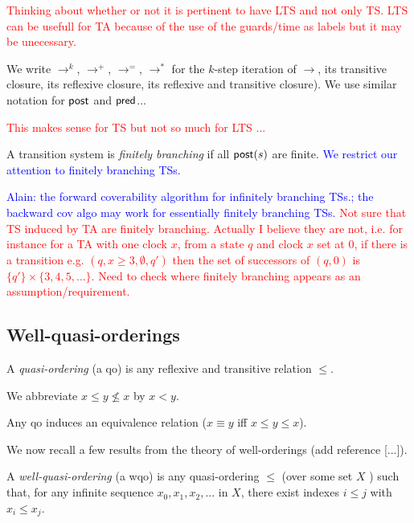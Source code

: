 \textcolor{red}{Thinking about whether or not it is pertinent to have LTS and not only TS. LTS can be usefull for TA because of the use of the guards/time as labels but it may be unecessary.}

We write $\rightarrow^{k}$, $\rightarrow^{+}$, $\rightarrow^{=}$, $\rightarrow^{*}$
for the $k$-step iteration of $\rightarrow$, its transitive closure, its reflexive closure, its reflexive and transitive closure). We use similar notation for $\textsf{post}$ and $\textsf{pred}$...

\textcolor{red}{This makes sense for TS but not so much for LTS ...}

A transition system is {\em finitely branching} if all $\textsf{post}(s)$ are finite. 
\textcolor{blue}{We restrict our attention to finitely branching TSs.}

\textcolor{blue}{Alain: the forward coverability algorithm for infinitely branching TSs.; the backward cov algo may work for essentially finitely branching TSs.}
\textcolor{red}{Not sure that TS induced by TA are finitely branching. Actually I believe they are not, i.e. for instance for a TA with one clock $x$, from a state $q$ and clock $x$ set at $0$, if there is a transition e.g. $(q, x \geq 3, \emptyset, q')$ then the set of successors of 
$(q,0)$ is $\{q'\} \times \{3, 4, 5, \ldots \}$. Need to check where finitely branching appears as an assumption/requirement.}


\subsection{Well-quasi-orderings}

A {\em quasi-ordering} (a qo) is any reflexive and transitive relation $\leq$.

We abbreviate $x \leq y \not\leq x$ by $x < y$.


Any qo induces an equivalence relation ($x \equiv y$ iff $x \leq y \leq x$).

We now recall a few results from the theory of well-orderings (add reference [...]).


\begin{definition}
 A {\em well-quasi-ordering} (a wqo) is any quasi-ordering $\leq$ (over some set $X$ ) such that, for any infinite sequence $x_0, x_1, x_2, ...$ in $X$, there exist indexes $i \leq j$ with
$x_i \leq  x_j$.
\end{definition}

